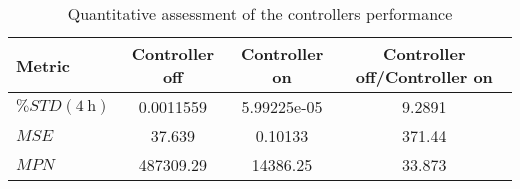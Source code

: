\begin{table}[tbh]
\centering
\caption{Quantitative assessment of the controllers performance}\label{tab:controllerDesignAndEvaluation_metrics}
\begin{tabular}{lSSS}
	\toprule
	Metric                 & {Controller off} & {Controller on} & {Controller off/Controller on} \\ \midrule
	$\%STD(\SI{4}{\hour})$ & 0.0011559        & 5.99225e-05     & 9.2891                         \\
	$MSE$                  & 37.639           & 0.10133         & 371.44                         \\
	$MPN$                  & 487309.29        & 14386.25        & 33.873                         \\ \bottomrule
\end{tabular}
\end{table}














